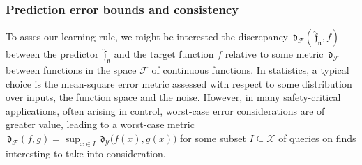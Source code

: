 \documentclass{article} %
\newtheorem{lem}[thm]{Lemma}
\theoremstyle{definition}
\theoremstyle{remark}
\newcommand{\Real}{\mathbb R}
\newcommand{\vc}[1]{#1}
\newcommand{\ball}[2]{\ensuremath{\mathfrak B_{\vc{#1}} \bigl( #2\bigr) }}
\newcommand{\data}{\ensuremath{ \mathcal D} }
\newcommand{\inspace}{\ensuremath{ \mathcal X}}
\newcommand{\outspace}{\ensuremath{ \mathcal Y}}
\newcommand{\fctspace}{\ensuremath{ \mathcal F}}
\newcommand{\grid}{\ensuremath{  G}}
\newcommand{\metric}{\, \mathfrak{d}} %
\newcommand{\Metrico}[2]{\metric_\outspace\bigl(#1,#2\bigr) }
\newcommand{\predf}{\, \mathfrak{  \hat f}} %
\newcommand{\predfn}{\, \mathfrak{  \hat f_n}} %
\newcommand{\obserr}{\mathfrak e} %
\newcommand{\obserrbnd}{\bar{\mathfrak e}}
\begin{document}
%




\subsubsection{Prediction error bounds and consistency}

To asses our learning rule, we might be interested the discrepancy $\metric_\fctspace(\predfn,f)$ between the predictor $\predfn$ and the target function $f$ relative to some metric $\metric_{\fctspace}$ between functions in the space $\fctspace$ of continuous functions. In statistics, a typical choice is the mean-square error metric assessed with respect to some distribution over inputs, the function space and the noise. However, in many safety-critical applications, often arising in control, worst-case error considerations are of greater value, leading to a worst-case metric 
$\metric_\fctspace(f,g) = \sup_{x \in I} \Metrico{ f(x)}{g(x)} $ for some subset $I \subseteq \inspace$ of queries on finds interesting to take into consideration. 
\end{document}
